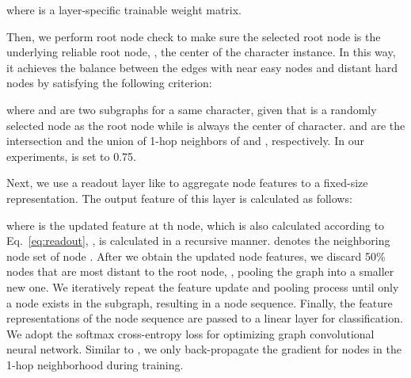 \documentclass[letterpaper]{article} \usepackage{aaai22}  \usepackage{times}  \usepackage{helvet}  \usepackage{courier}  \usepackage[hyphens]{url}  \usepackage{graphicx} \urlstyle{rm} \def\UrlFont{\rm}  \usepackage{natbib}  \usepackage{caption} \DeclareCaptionStyle{ruled}{labelfont=normalfont,labelsep=colon,strut=off} \frenchspacing  \setlength{\pdfpagewidth}{8.5in}  \setlength{\pdfpageheight}{11in}
\begin{document}
where  is a layer-specific trainable weight matrix.


Then, we perform root node check to make sure the selected root node is the underlying reliable root node, , the center of the character instance. In this way, it achieves the balance between the edges with near easy nodes and distant hard nodes by satisfying the following criterion:

where  and  are two subgraphs for a same character, given that  is a randomly selected node as the root node while  is always the center of character.  and  are the intersection and the union of 1-hop neighbors of  and , respectively. In our experiments,  is set to 0.75.




Next, we use a readout layer like \cite{Lee2019SelfAttentionGP} to aggregate node features to a fixed-size representation. The output feature of this layer is calculated as follows:

where  is the updated feature at th node, which is also calculated according to Eq.~\eqref{eq:readout}, ,  is calculated in a recursive manner.  denotes the neighboring node set of node . 
After we obtain the updated node features, we discard 50\% nodes that are most distant to the root node, , pooling the graph into a smaller new one. We iteratively repeat the feature update and pooling process until only a node exists in the subgraph, resulting in a node sequence. Finally, the feature representations of the node sequence are passed to a linear layer for classification. We adopt the softmax cross-entropy loss for optimizing graph convolutional neural network. Similar to \cite{wang2019linkage}, we only back-propagate the gradient for nodes in the 1-hop neighborhood during training.
\end{document}
